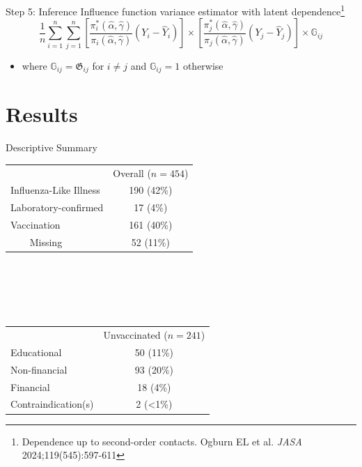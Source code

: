 \documentclass{beamer}
\begin{document}
\begin{frame}{Step 5: Inference}
	Influence function variance estimator with latent dependence\footnote[frame]{Dependence up to second-order contacts. Ogburn EL et al. \textit{JASA} 2024;119(545):597-611}
	\begin{equation*}
		\frac{1}{n} \sum_{i=1}^{n} \sum_{j=1}^{n} \left[ \frac{\pi_i^* (\hat{\alpha}, \hat{\gamma})}{\pi_i (\hat{\alpha}, \hat{\gamma})} \left(Y_i - \hat{Y}_i \right) \right] \times \left[\frac{\pi_j^* (\hat{\alpha}, \hat{\gamma})}{\pi_j (\hat{\alpha}, \hat{\gamma})} \left(Y_j - \hat{Y}_j \right)\right] \times \mathbb{G}_{ij}
	\end{equation*}
	\begin{itemize}
		\item where $\mathbb{G}_{ij} = \mathfrak{G}_{ij}$ for $i \ne j$ and $\mathbb{G}_{ij} = 1$ otherwise
	\end{itemize}
\end{frame}

\section{Results}

\begin{frame}{Descriptive Summary}
	\centering
	\begin{tabular}{llc}
		\hline
		&                        & Overall ($n=454$) \\ \cline{3-3} 
		\multicolumn{2}{l}{Influenza-Like Illness}             & 190 (42\%)        \\
		\multicolumn{2}{l}{Laboratory-confirmed} & 17 (4\%)          \\
		\multicolumn{2}{l}{Vaccination}          & 161 (40\%)        \\
		& Missing                & 52 (11\%)         \\ \hline
	\end{tabular}
	~\\~\\~\\~\\
	\begin{tabular}{lc}
		\hline
		& Unvaccinated ($n=241$)             \\ \cline{2-2} 
		Educational         & 50 (11\%)          \\
		Non-financial       & 93 (20\%)          \\
		Financial           & 18 (4\%)           \\
		Contraindication(s) & 2 (\textless{}1\%) \\ \hline
	\end{tabular}
\end{frame}
\end{document}
